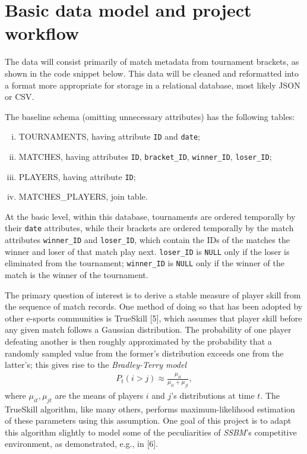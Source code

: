 \documentclass[10pt]{article}
\theoremstyle{definition}
\theoremstyle{remark}
\begin{document}
\hypertarget{basic-data-model-and-project-workflow}{%
\section{Basic data model and project
workflow}\label{basic-data-model-and-project-workflow}}

The data will consist primarily of match metadata from tournament
brackets, as shown in the code snippet below. This data will be cleaned
and reformatted into a format more appropriate for storage in a
relational database, most likely JSON or CSV.

The baseline schema (omitting unnecessary attributes) has the following
tables:
\begin{enumerate}[i.]
    \item TOURNAMENTS, having attribute \texttt{ID} and \texttt{date};
    \item MATCHES, having attributes \texttt{ID}, \texttt{bracket\_ID},
        \texttt{winner\_ID}, \texttt{loser\_ID};
    \item PLAYERS, having attribute \texttt{ID};
    \item MATCHES\_PLAYERS, join table.
\end{enumerate}

At the basic level, within this database, tournaments are ordered
temporally by their \texttt{date} attributes, while their brackets are
ordered temporally by the match attributes \texttt{winner\_ID} and
\texttt{loser\_ID}, which contain the IDs of the matches the winner and
loser of that match play next. \texttt{loser\_ID} is \texttt{NULL} only
if the loser is eliminated from the tournament; \texttt{winner\_ID} is
\texttt{NULL} only if the winner of the match is the winner of the
tournament.

The primary question of interest is to derive a stable measure of player
skill from the sequence of match records. One method of doing so that
has been adopted by other e-sports communities is TrueSkill {[}5{]},
which assumes that player skill before any given match follows a
Gaussian distribution. The probability of one player defeating another
is then roughly approximated by the probability that a randomly sampled
value from the former's distribution exceeds one from the latter's; this
gives rise to the \emph{Bradley-Terry model}
\begin{align*}
    P_t(i > j) \approx \frac{\mu_{it}}{\mu_{it} + \mu_{jt}},
\end{align*}
where $\mu_{it}, \mu_{jt}$ are the means of players $i$ and $j$'s
distributions at time $t$. The TrueSkill algorithm, like many others,
performs maximum-likelihood estimation of these parameters using this
assumption. One goal of this project is to adapt this algorithm slightly
to model some of the peculiarities of \emph{SSBM}'s competitive
environment, as demonstrated, e.g., in {[}6{]}.
\end{document}
